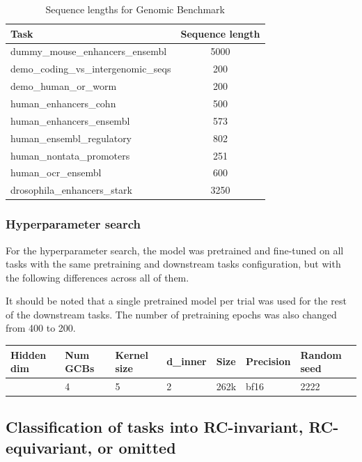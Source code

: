\documentclass[   ]{article}
\begin{document}
\begin{table}[htbp]
	\centering
	\caption{Sequence lengths for Genomic Benchmark}
	\begin{tabular}{lc}
		\toprule
		Task & Sequence length \\
		\midrule
		dummy\_mouse\_enhancers\_ensembl & 5000 \\
		demo\_coding\_vs\_intergenomic\_seqs & 200 \\
		demo\_human\_or\_worm & 200 \\
		human\_enhancers\_cohn & 500 \\
		human\_enhancers\_ensembl & 573 \\
		human\_ensembl\_regulatory & 802 \\
		human\_nontata\_promoters & 251 \\
		human\_ocr\_ensembl & 600 \\
		drosophila\_enhancers\_stark & 3250 \\
		\bottomrule
	\end{tabular}
\end{table}

\subsubsection{Hyperparameter search}\label{hyperparameter-search}

For the hyperparameter search, the model was pretrained and fine-tuned
on all tasks with the same pretraining and downstream tasks
configuration, but with the following differences across all of them.

It should be noted that a single pretrained model per trial was used for
the rest of the downstream tasks. The number of pretraining epochs was
also changed from 400 to 200.

{\def\LTcaptype{none} %
\begin{longtable}[]{@{}lllllll@{}}
\toprule\noalign{}
Hidden dim & Num GCBs & Kernel size & d\_inner & Size & Precision & Random seed \\
\midrule\noalign{}
\endhead
\bottomrule\noalign{}
\endlastfoot
64 & 4 & 5 & 2 & 262k & bf16 & 2222 \\
\end{longtable}
}

\subsection{Classification of tasks into RC-invariant, RC-equivariant, or omitted}
\label{sec:downstream-task-canon-classification}
\end{document}
